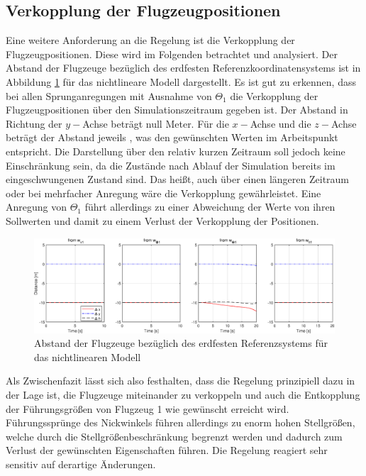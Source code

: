 \subsection{Verkopplung der Flugzeugpositionen}
Eine weitere Anforderung an die Regelung ist die Verkopplung der Flugzeugpositionen. Diese wird im Folgenden betrachtet und analysiert. Der Abstand der Flugzeuge bezüglich des erdfesten Referenzkoordinatensystems ist in Abbildung \ref{fig:distance_xyz_nlinear} für das nichtlineare Modell dargestellt. Es ist gut zu erkennen, dass bei allen Sprunganregungen mit Ausnahme von $\Theta_1$ die Verkopplung der Flugzeugpositionen über den Simulationszeitraum gegeben ist. Der Abstand in Richtung der $y-$Achse beträgt null Meter. Für die $x-$Achse und die $z-$Achse beträgt der Abstand jeweils , was den gewünschten Werten im Arbeitspunkt entspricht. Die Darstellung über den relativ kurzen Zeitraum soll jedoch keine Einschränkung sein, da die Zustände nach Ablauf der Simulation bereits im eingeschwungenen Zustand sind. Das heißt, auch über einen längeren Zeitraum oder bei mehrfacher Anregung wäre die Verkopplung gewährleistet. Eine Anregung von $\Theta_1$ führt allerdings zu einer Abweichung der Werte von ihren Sollwerten und damit zu einem Verlust der Verkopplung der Positionen. 
\begin{figure}[h] %
	\centering
	\includegraphics[scale=0.6]{./Bilder/distance_xyz_nlinear.eps}
	\caption{Abstand der Flugzeuge bezüglich des erdfesten Referenzsystems für das nichtlinearen Modell}
	\label{fig:distance_xyz_nlinear}
\end{figure}
Als Zwischenfazit lässt sich also festhalten, dass die Regelung prinzipiell dazu in der Lage ist, die Flugzeuge miteinander zu verkoppeln und auch die Entkopplung der Führungsgrößen von Flugzeug 1 wie gewünscht erreicht wird. Führungssprünge des Nickwinkels führen allerdings zu enorm hohen Stellgrößen, welche durch die Stellgrößenbeschränkung begrenzt werden und dadurch zum Verlust der gewünschten Eigenschaften führen. Die Regelung reagiert sehr sensitiv auf derartige Änderungen.

